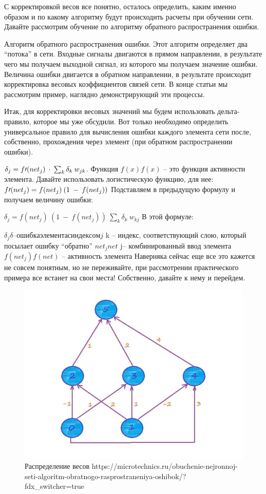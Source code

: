 \documentclass[12pt,a4paper]{report}
\begin{document}
С корректировкой весов все понятно, осталось определить, каким именно образом и по какому алгоритму будут происходить расчеты при обучении сети. Давайте рассмотрим обучение по алгоритму обратного распространения ошибки.

Алгоритм обратного распространения ошибки.
Этот алгоритм определяет два “потока” в сети. Входные сигналы двигаются в прямом направлении, в результате чего мы получаем выходной сигнал, из которого мы получаем значение ошибки. Величина ошибки двигается в обратном направлении, в результате происходит корректировка весовых коэффициентов связей сети. В конце статьи мы рассмотрим пример, наглядно демонстрирующий эти процессы.

Итак, для корректировки весовых значений мы будем использовать дельта-правило, которое мы уже обсудили. Вот только необходимо определить универсальное правило для вычисления ошибки каждого элемента сети после, собственно, прохождения через элемент (при обратном распространении ошибки).

$\delta_j = f{\Large{\prime}}(net_j)\medspace\cdot\medspace \sum_{k}{}{\delta_k\medspace w_{jk}}$. Функция $f(x)f(x)$ – это функция активности элемента. Давайте использовать логистическую функцию, для нее:
$f{\Large{\prime}}(net_j) = f(net_j)\medspace (1\medspace-\medspace f(net_j))$
Подставляем в предыдущую формулу и получаем величину ошибки:

$\delta_j = f(net_j)\medspace (1\medspace-\medspace f(net_j))\medspace \sum_{k}{}{\delta_k\medspace w_{kj}}$
В этой формуле:

$\delta_jδ  – ошибка элемента с индексом j$
k – индекс, соответствующий слою, который посылает ошибку “обратно”
$net_jnet$ 
j– комбинированный ввод элемента
$f(net_j)f(net)$ – активность элемента
Наверняка сейчас еще все это кажется не совсем понятным, но не переживайте, при рассмотрении практического примера все встанет на свои места! Собственно, давайте к нему и перейдем.

\begin{figure}
	\centering
	\includegraphics[width=\columnwidth]{weight}
	\caption{Распределение весов
	https://microtechnics.ru/obuchenie-nejronnoj-seti-algoritm-obratnogo-rasprostraneniya-oshibok/?fdx_switcher=true}
	\end{figure}
\end{document}
